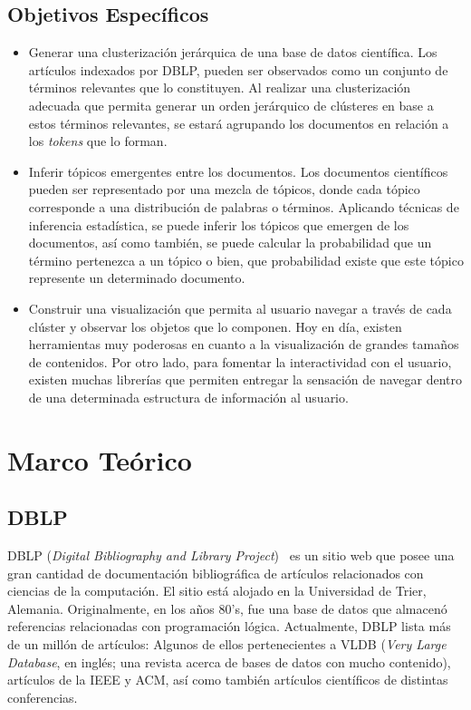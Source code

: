\documentclass[12pt,oneside,letterpaper]{book}
\newcommand{\eng}[1]{\textit{#1}\xspace}			%
\newcommand{\abr}[1]{\textsc{#1}\xspace}           %
\theoremstyle{definition}
\begin{document}
\section{Objetivos Específicos}
\label{sec:objetivos_especificos}
\begin{itemize}
	\item Generar una clusterización jerárquica de una base de datos científica.
	Los artículos indexados por DBLP, pueden ser observados como un conjunto de términos relevantes que lo constituyen. Al realizar una clusterización adecuada que permita generar un orden jerárquico de clústeres en base a estos términos relevantes, se estará agrupando los documentos en relación a los \eng{tokens} que lo forman.

	\item Inferir tópicos emergentes entre los documentos.
	Los documentos científicos pueden ser representado por una mezcla de tópicos, donde cada tópico corresponde a una distribución de palabras o términos. Aplicando técnicas de inferencia estadística, se puede inferir los tópicos que emergen de los documentos, así como también, se puede calcular la probabilidad que un término pertenezca a un tópico o bien, que probabilidad existe que este tópico represente un determinado documento.

	\item Construir una visualización que permita al usuario navegar a través de cada clúster y observar los objetos que lo componen.
	Hoy en día, existen herramientas muy poderosas en cuanto a la visualización de grandes tamaños de contenidos. Por otro lado, para fomentar la interactividad con el usuario, existen muchas librerías que permiten entregar la sensación de navegar dentro de una determinada estructura de información al usuario.
\end{itemize}

\chapter{Marco Teórico}
\section{\abr{DBLP}}
\label{sec:dblp}
\abr{DBLP} (\eng{Digital Bibliography and Library Project})~\cite{DBLPLey2002} es un sitio web que posee una gran cantidad de documentación bibliográfica de artículos relacionados con ciencias de la computación. El sitio está alojado en la Universidad de Trier, Alemania. Originalmente, en los años 80's, fue una base de datos que almacenó referencias relacionadas con programación lógica. Actualmente, DBLP lista más de un millón de artículos: Algunos de ellos pertenecientes a \abr{VLDB} (\eng{Very Large Database}, en inglés; una revista acerca de bases de datos con mucho contenido), artículos de la \abr{IEEE} y \abr{ACM}, así como también artículos científicos de distintas conferencias.
\end{document}
